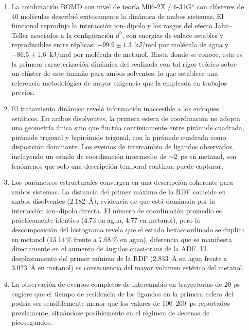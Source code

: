 \begin{enumerate}
    \item La combinación BOMD con nivel de teoría M06-2X / 6-31G* con clústeres de 40 moléculas describió exitosamente la dinámica de ambos sistemas. El funcional reprodujo la interacción ion--dipolo y los rasgos del efecto Jahn--Teller asociados a la configuración $d^9$, con energías de enlace estables y reproducibles entre réplicas: $-99.9 \pm 1.3$~kJ/mol por molécula de agua y $-86.5 \pm 1.6$~kJ/mol por molécula de metanol. Hasta donde se conoce, esta es la primera caracterización dinámica del  realizada con tal rigor teórico sobre un clúster de este tamaño para ambos solventes, lo que establece una referencia metodológica de mayor exigencia que la empleada en trabajos previos.

    \item El tratamiento dinámico reveló información inaccesible a los enfoques estáticos. En ambos disolventes, la primera esfera de coordinación no adopta una geometría única sino que fluctúa continuamente entre pirámide cuadrada, pirámide trigonal y bipirámide trigonal, con la pirámide cuadrada como disposición dominante. Los eventos de intercambio de ligandos observados, incluyendo un estado de coordinación intermedio de $\sim 2$~ps en metanol, son fenómenos que solo una descripción temporal continua puede capturar.

    \item Los parámetros estructurales convergen en una descripción coherente para ambos sistemas. La distancia  del primer máximo de la RDF coincide en ambos disolventes (2.182~\AA), evidencia de que está dominada por la interacción ion--dipolo directa. El número de coordinación promedio es prácticamente idéntico (4.73 en agua, 4.77 en metanol), pero la descomposición del histograma revela que el estado hexacoordinado se duplica en metanol (13.14\,\% frente a 7.68\,\% en agua), diferencia que se manifiesta directamente en el aumento de ángulos cuasi-trans de la ADF. El desplazamiento del primer mínimo de la RDF (2.833~\AA{} en agua frente a 3.023~\AA{} en metanol) es consecuencia del mayor volumen estérico del metanol.

    \item La observación de eventos completos de intercambio en trayectorias de 20 ps sugiere que el tiempo de residencia de los ligandos en la primera esfera del  podría ser sensiblemente menor que los valores de 100--200~ps reportados previamente, situándose posiblemente en el régimen de decenas de picosegundos.


\end{enumerate}
